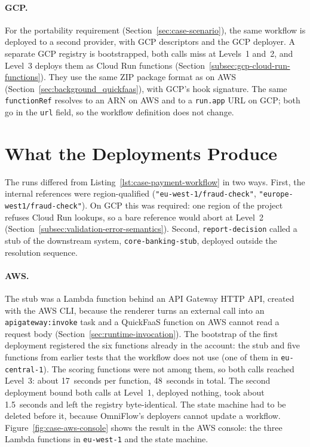 \paragraph{GCP.} For the portability requirement (Section~\ref{sec:case-scenario}), the same
workflow is deployed to a second provider, with GCP descriptors and the GCP deployer. A separate GCP
registry is bootstrapped, both calls miss at Levels~1 and~2, and Level~3 deploys them as Cloud Run
functions (Section~\ref{subsec:gcp-cloud-run-functions}). They use the same ZIP package format as
on AWS (Section~\ref{sec:background_quickfaas}), with GCP's hook signature. The same
\texttt{functionRef} resolves to an ARN on AWS and to a \texttt{run.app} URL on GCP; both go in the
\texttt{url} field, so the workflow definition does not change.

\section{What the Deployments Produce}
\label{sec:case-artifacts}

The runs differed from Listing~\ref{lst:case-payment-workflow} in two ways. First, the internal
references were region-qualified (\texttt{"eu-west-1/fraud-check"},
\texttt{"europe-west1/fraud-check"}). On GCP this was required: one region of the project refuses
Cloud Run lookups, so a bare reference would abort at Level~2
(Section~\ref{subsec:validation-error-semantics}). Second, \texttt{report-decision} called a stub of
the downstream system, \texttt{core-banking-stub}, deployed outside the resolution sequence.

\paragraph{AWS.} The stub was a Lambda function behind an API Gateway HTTP API, created with the
AWS CLI, because the renderer turns an external call into an \texttt{apigateway:invoke} task and a
QuickFaaS function on AWS cannot read a request body (Section~\ref{sec:runtime-invocation}). The
bootstrap of the first deployment registered the six functions already in the account: the stub
and five functions from earlier tests that the workflow does not use (one of them in
\texttt{eu-central-1}). The scoring functions were not among them, so both calls reached Level~3:
about 17~seconds per function, 48~seconds in total. The second deployment bound both calls at
Level~1, deployed nothing, took about 1.5~seconds and left the registry byte-identical. The state
machine had to be deleted before it, because OmniFlow's deployers cannot update a workflow.
Figure~\ref{fig:case-aws-console} shows the result in the AWS console: the three Lambda functions
in \texttt{eu-west-1} and the state machine.

